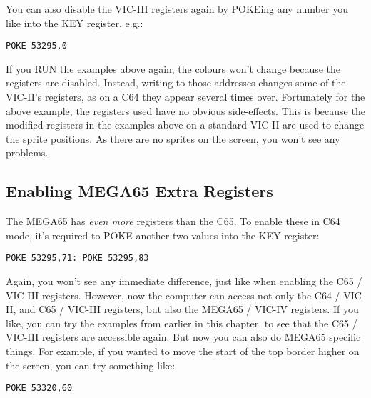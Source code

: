 You can also disable the VIC-III registers again by POKEing any number you like into the KEY register, e.g.:

\begin{tcolorbox}[colback=black,coltext=white]
\verbatimfont{\codefont}
\begin{verbatim}
POKE 53295,0
\end{verbatim}
\end{tcolorbox}

If you RUN the examples above again, the colours won't change because
the registers are disabled. Instead, writing to those addresses changes some of the VIC-II's registers,
as on a C64 they appear several times over.  Fortunately for the above example, the registers used have no obvious
side-effects. This is because the modified registers in the examples above on a standard VIC-II are used to change the
sprite positions. As there are no sprites on the screen, you won't see any problems.

\subsection{Enabling MEGA65 Extra Registers}

The MEGA65 has \textit{even more} registers than the C65.  To enable these in C64 mode, it's required to POKE another
two values into the KEY register:

\begin{tcolorbox}[colback=black,coltext=white]
\verbatimfont{\codefont}
\begin{verbatim}
POKE 53295,71: POKE 53295,83
\end{verbatim}
\end{tcolorbox}

Again, you won't see any immediate difference, just like when enabling the C65 / VIC-III registers.  However, now the computer
can access not only the C64 / VIC-II, and C65 / VIC-III registers, but also the MEGA65 / VIC-IV registers.  If you like,
you can try the examples from earlier in this chapter, to see that the C65 / VIC-III registers are accessible again.
But now you can also do MEGA65 specific things. For example, if you wanted to move the start of the top border higher
on the screen, you can try something like:

\begin{tcolorbox}[colback=black,coltext=white]
\verbatimfont{\codefont}
\begin{verbatim}
POKE 53320,60
\end{verbatim}
\end{tcolorbox}

